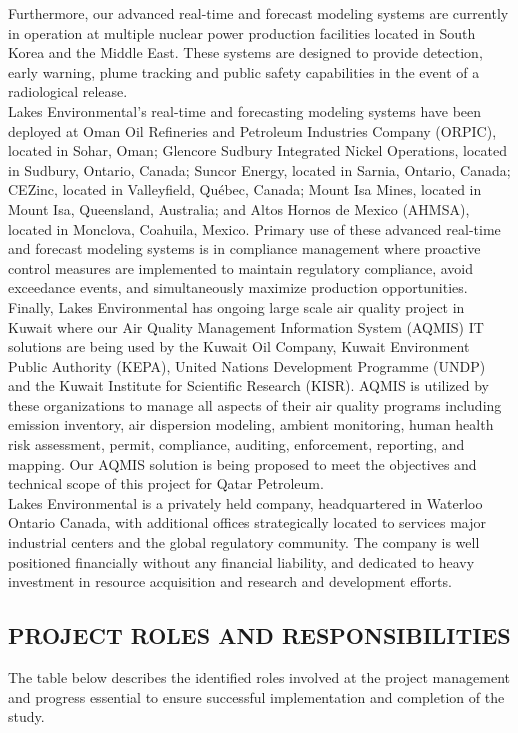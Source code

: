 Furthermore, our advanced real-time and forecast modeling systems are currently in operation at multiple nuclear power production facilities located in South Korea and the Middle East. These systems are designed to provide detection, early warning, plume tracking and public safety capabilities in the event of a radiological release.\\

Lakes Environmental’s real-time and forecasting modeling systems have been deployed at Oman Oil Refineries and Petroleum Industries Company (ORPIC), located in Sohar, Oman; Glencore Sudbury Integrated Nickel Operations, located in Sudbury, Ontario, Canada; Suncor Energy, located in Sarnia, Ontario, Canada; CEZinc, located in Valleyfield, Québec, Canada; Mount Isa Mines, located in Mount Isa, Queensland, Australia; and Altos Hornos de Mexico (AHMSA), located in Monclova, Coahuila, Mexico. Primary use of these advanced real-time and forecast modeling systems is in compliance management where proactive control measures are implemented to maintain regulatory compliance, avoid exceedance events, and simultaneously maximize production opportunities. Finally, Lakes Environmental has ongoing large scale air quality project in Kuwait where our Air Quality Management Information System (AQMIS) IT solutions are being used by the Kuwait Oil Company, Kuwait Environment Public Authority (KEPA), United Nations Development Programme (UNDP) and the Kuwait Institute for Scientific Research (KISR). AQMIS is utilized by these organizations to manage all aspects of their air quality programs including emission inventory, air dispersion modeling, ambient monitoring, human health risk assessment, permit, compliance, auditing, enforcement, reporting, and mapping. Our AQMIS solution is being proposed to meet the objectives and technical scope of this project for Qatar Petroleum.\\

Lakes Environmental is a privately held company, headquartered in Waterloo Ontario Canada, with additional offices strategically located to services major industrial centers and the global regulatory community. The company is well positioned financially without any financial liability, and dedicated to heavy investment in resource acquisition and research and development efforts.

\subsection{PROJECT ROLES AND RESPONSIBILITIES}
The table below describes the identified roles involved at the project management and progress essential to ensure successful implementation and completion of the study.\\

